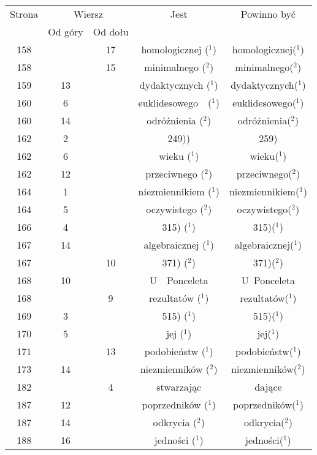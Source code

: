 \documentclass[a4paper,11pt]{article}
\begin{document}
\begin{center}
  \newpage

  \begin{tabular}{|c|c|c|c|c|}
    \hline
    Strona & \multicolumn{2}{c|}{Wiersz} & Jest
                              & Powinno być \\ \cline{2-3}
    & Od góry & Od dołu & & \\
    \hline
    158 & & 17 & homologicznej ($^{ 1 }$) & homologicznej($^{ 1 }$) \\
    158 & & 15 & minimalnego ($^{ 2 }$) & minimalnego($^{ 2 }$) \\
    159 & 13 & & dydaktycznych ($^{ 1 }$) & dydaktycznych($^{ 1 }$) \\
    160 &  6 & & euklidesowego~~($^{ 1 }$) & euklidesowego($^{ 1 }$) \\
    160 & 14 & & odróżnienia ($^{ 2 }$) & odróżnienia($^{ 2 }$) \\
    162 &  2 & & 249)) & 259) \\
    162 &  6 & & wieku ($^{ 1 }$) & wieku($^{ 1 }$) \\
    162 & 12 & & przeciwnego ($^{ 2 }$) & przeciwnego($^{ 2 }$) \\
    164 &  1 & & niezmiennikiem ($^{ 1 }$) & niezmiennikiem($^{ 1 }$) \\
    164 &  5 & & oczywistego ($^{ 2 }$) & oczywistego($^{ 2 }$) \\
    166 &  4 & & 315) ($^{ 1 }$) & 315)($^{ 1 }$) \\
    167 & 14 & & algebraicznej ($^{ 1 }$) & algebraicznej($^{ 1 }$) \\
    167 & & 10 & 371) ($^{ 2 }$) & 371)($^{ 2 }$) \\
    168 & 10 & & U~~Ponceleta & U~Ponceleta \\
    168 & &  9 & rezultatów ($^{ 1 }$) & rezultatów($^{ 1 }$) \\
    169 &  3 & & 515) ($^{ 1 }$) & 515)($^{ 1 }$) \\
    170 &  5 & & jej ($^{ 1 }$) & jej($^{ 1 }$) \\
    171 & & 13 & podobieństw ($^{ 1 }$) & podobieństw($^{ 1 }$) \\
    173 & 14 & & niezmienników ($^{ 2 }$) & niezmienników($^{ 2 }$) \\
    182 & &  4 & stwarzając & dające \\
    187 & 12 & & poprzedników ($^{ 1 }$) & poprzedników($^{ 1 }$) \\
    187 & 14 & & odkrycia ($^{ 2 }$) & odkrycia($^{ 2 }$) \\
    188 & 16 & & jedności ($^{ 1 }$) & jedności($^{ 1 }$) \\

\end{tabular}
\end{center}
\end{document}

